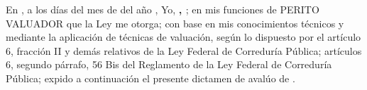 
En  \lugarInforme{}, a los \numberstringnum{\diainforme} d\'ias del mes de \monthname[\mesinforme] del a\~no \numberstringnum{\annoinforme}, Yo, \textbf{\textcolor{principal}{\nombrePerito, \descripcionPerito}}; en mis funciones de PERITO VALUADOR que la Ley  me otorga; con base en mis conocimientos t\'ecnicos y mediante la aplicaci\'on de t\'ecnicas de valuaci\'on, seg\'un lo dispuesto por el art\'iculo 6, fracci\'on II y dem\'as relativos de la Ley Federal de Corredur\'ia P\'ublica; art\'iculos 6, segundo p\'arrafo, 56 Bis del Reglamento de la Ley Federal de Corredur\'ia P\'ublica; expido a continuaci\'on el presente dictamen de avalúo de \textcolor{principal}{\tipoAvaluo}.\\

